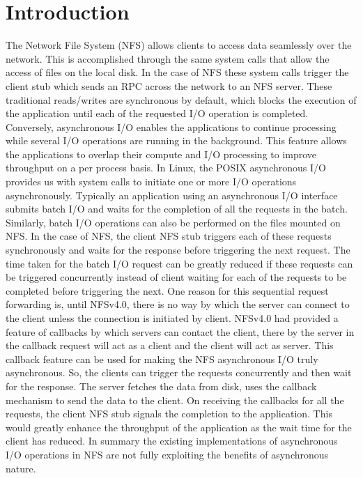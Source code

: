 \section{Introduction}
\label{intro}

The Network File System (NFS) allows clients to access data seamlessly over the network. This is accomplished through the same system calls that allow the access of files on the local disk. In the case of NFS these system calls trigger the client stub which sends an RPC across the network to an NFS server. These traditional reads/writes are synchronous by default, which blocks the execution of the application until each of the requested I/O operation is completed. Conversely, asynchronous I/O enables the applications to continue processing while several I/O operations are running in the background. This feature allows the applications to overlap their compute and I/O processing to improve throughput on a per process basis. In Linux, the POSIX asynchronous I/O \cite{aio} provides us with system calls to initiate one or more I/O operations asynchronously. Typically an application using an asynchronous I/O interface submits batch I/O and waits for the completion of all the requests in the batch. Similarly, batch I/O operations can also be performed on the files mounted on NFS. In the case of NFS, the client NFS stub triggers each of these requests synchronously and waits for the response before triggering the next request. The time taken for the batch I/O request can be greatly reduced if these requests can be triggered concurrently instead of client waiting for each of the requests to be completed before triggering the next. One reason for this sequential request forwarding is, until NFSv4.0, there is no way by which the server can connect to the client unless the connection is initiated by client. NFSv4.0 had provided a feature of callbacks by which servers can contact the client, there by the server in the callback request will act as a client and the client will act as server. This callback feature can be used for making the NFS asynchronous I/O truly asynchronous. So, the clients can trigger the requests concurrently and then wait for the response. The server fetches the data from disk,  uses the callback mechanism to send the data to the client. On receiving the callbacks for all the requests, the client NFS stub signals the completion  to the  application. This would greatly enhance the throughput of the application as the wait time for the client has reduced. In summary the existing implementations of asynchronous I/O operations in NFS are not fully exploiting the benefits of asynchronous nature.

